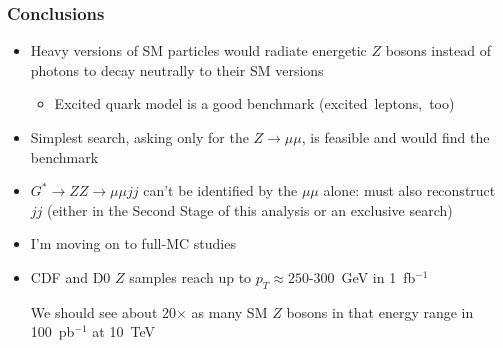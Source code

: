 \documentclass[compress]{beamer}
\begin{document}
\begin{frame}
\frametitle{Conclusions}
\begin{itemize}\setlength{\itemsep}{0.25 cm}
\item Heavy versions of SM particles would radiate energetic $Z$
  bosons instead of photons to decay neutrally to their SM versions
\begin{itemize}
\item Excited quark model is a good benchmark \mbox{(excited leptons, too)\hspace{-1 cm}}
\end{itemize}
\item Simplest search, asking only for the $Z\to\mu\mu$, is feasible
  and would find the benchmark
\item $G^* \to ZZ \to \mu\mu jj$ can't be identified by the $\mu\mu$
  alone: must also reconstruct $jj$ (either in the Second Stage of
  this analysis or an exclusive search)
\item I'm moving on to full-MC studies
\item CDF and D0 $Z$ samples reach up to $p_T \approx 250$-$300$~GeV
  in 1~fb$^{-1}$

  \vspace{0.1 cm}
  We should see about 20$\times$ as many SM $Z$ bosons in
  that energy range in 100~pb$^{-1}$ at 10~TeV
\end{itemize}
\label{numpages}
\end{frame}
\end{document}
